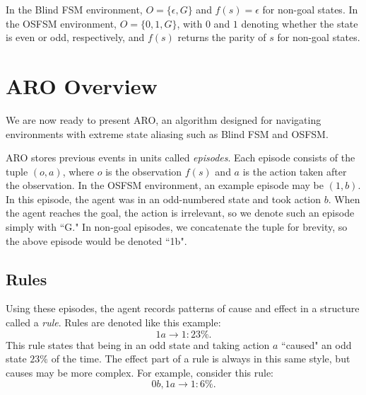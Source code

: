\documentclass[letterpaper]{article} %
\begin{document}
In the Blind FSM environment, $O = \{\epsilon, G\}$ and $f(s)
= \epsilon$ for non-goal states. In the OSFSM environment, $O = \{0,
1, G\}$, with $0$ and $1$ denoting whether the state is even or odd,
respectively, and $f(s)$ returns the parity of $s$ for non-goal
states.



\section{ARO Overview}

We are now ready to present ARO, an algorithm designed for navigating
environments with extreme state aliasing such as Blind FSM and OSFSM.


ARO stores previous events in units called \textit{episodes}. Each episode
consists of the tuple $(o, a)$, where $o$ is the observation $f(s)$
and $a$ is the action taken after the observation. In the OSFSM
environment, an example episode may be $(1,b)$. In this episode, the
agent was in an odd-numbered state and took action $b$. When the agent
reaches the goal, the action is irrelevant, so we denote such an
episode simply with ``G." In non-goal episodes, we concatenate the
tuple for brevity, so the above episode would be denoted ``1b".


\subsection{Rules}

Using these episodes, the agent records patterns of cause and effect
in a structure called a \textit{rule}. Rules are denoted like this
example: $$1a \rightarrow 1: 23\%.$$ This rule states that being in an
odd state and taking action $a$ ``caused" an odd state $23\%$ of the
time. The effect part of a rule is always in this same style, but
causes may be more complex. For example, consider this
rule: $$0b,1a \rightarrow 1: 6\%.$$

\end{document}
